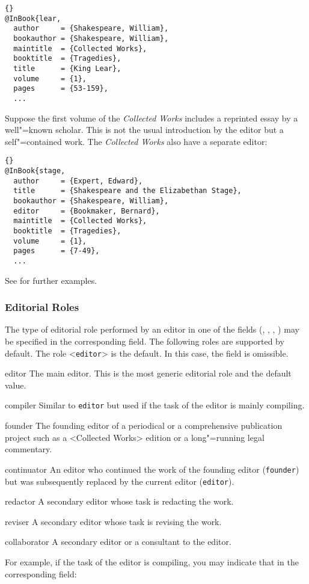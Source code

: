 \documentclass{ltxdockit}[2011/03/25]
\begin{document}
\begin{lstlisting}[style=bibtex]{}
@InBook{lear,
  author     = {Shakespeare, William},
  bookauthor = {Shakespeare, William},
  maintitle  = {Collected Works},
  booktitle  = {Tragedies},
  title      = {King Lear},
  volume     = {1},
  pages      = {53-159},
  ...
\end{lstlisting}
%
Suppose the first volume of the \emph{Collected Works} includes a reprinted essay by a well"=known scholar. This is not the usual introduction by the editor but a self"=contained work. The \emph{Collected Works} also have a separate editor:

\begin{lstlisting}[style=bibtex]{}
@InBook{stage,
  author     = {Expert, Edward},
  title      = {Shakespeare and the Elizabethan Stage},
  bookauthor = {Shakespeare, William},
  editor     = {Bookmaker, Bernard},
  maintitle  = {Collected Works},
  booktitle  = {Tragedies},
  volume     = {1},
  pages      = {7-49},
  ...
\end{lstlisting}
%
See  for further examples.

\subsubsection{Editorial Roles}
\label{bib:use:edr}

The type of editorial role performed by an editor in one of the  fields (\ie {}, , , ) may be specified in the corresponding  field. The following roles are supported by default. The role <\texttt{editor}> is the default. In this case, the  field is omissible.

\begin{marglist}
\setlength{\itemsep}{0pt}
\item[editor] The main editor. This is the most generic editorial role and the default value.
\item[compiler] Similar to \texttt{editor} but used if the task of the editor is mainly compiling.
\item[founder] The founding editor of a periodical or a comprehensive publication project such as a <Collected Works> edition or a long"=running legal commentary.
\item[continuator] An editor who continued the work of the founding editor (\texttt{founder}) but was subsequently replaced by the current editor (\texttt{editor}).
\item[redactor] A secondary editor whose task is redacting the work.
\item[reviser] A secondary editor whose task is revising the work.
\item[collaborator] A secondary editor or a consultant to the editor.
\end{marglist}
%
For example, if the task of the editor is compiling, you may indicate that in the corresponding  field:
\end{document}
